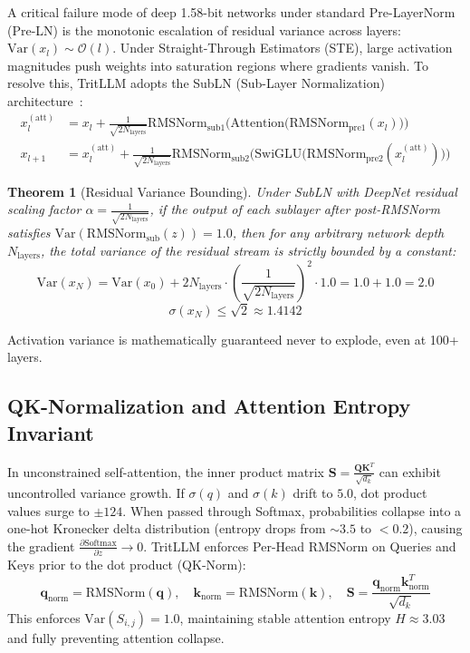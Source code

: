 \documentclass[11pt,a4paper]{article}
\newtheorem{theorem}{Theorem}
\begin{document}
A critical failure mode of deep 1.58-bit networks under standard Pre-LayerNorm (Pre-LN) is the monotonic escalation of residual variance across layers: $\text{Var}(x_l) \sim \mathcal{O}(l)$. Under Straight-Through Estimators (STE), large activation magnitudes push weights into saturation regions where gradients vanish. To resolve this, TritLLM adopts the SubLN (Sub-Layer Normalization) architecture~\cite{wang2022deepnet}:
\begin{align}
x_l^{(\text{att})} &= x_l + \frac{1}{\sqrt{2 N_{\text{layers}}}} \text{RMSNorm}_{\text{sub1}}\Big( \text{Attention}\big( \text{RMSNorm}_{\text{pre1}}(x_l) \big) \Big) \\
x_{l+1} &= x_l^{(\text{att})} + \frac{1}{\sqrt{2 N_{\text{layers}}}} \text{RMSNorm}_{\text{sub2}}\Big( \text{SwiGLU}\big( \text{RMSNorm}_{\text{pre2}}(x_l^{(\text{att})}) \big) \Big)
\end{align}

\begin{theorem}[Residual Variance Bounding]
Under SubLN with DeepNet residual scaling factor $\alpha = \frac{1}{\sqrt{2 N_{\text{layers}}}}$, if the output of each sublayer after post-RMSNorm satisfies $\text{Var}(\text{RMSNorm}_{\text{sub}}(z)) = 1.0$, then for any arbitrary network depth $N_{\text{layers}}$, the total variance of the residual stream is strictly bounded by a constant:
\begin{equation}
\text{Var}(x_N) = \text{Var}(x_0) + 2 N_{\text{layers}} \cdot \left(\frac{1}{\sqrt{2 N_{\text{layers}}}}\right)^2 \cdot 1.0 = 1.0 + 1.0 = \mathbf{2.0}
\end{equation}
\begin{equation}
\sigma(x_N) \le \sqrt{2} \approx \mathbf{1.4142}
\end{equation}
\end{theorem}
Activation variance is mathematically guaranteed never to explode, even at 100+ layers.

\subsection{QK-Normalization and Attention Entropy Invariant}

In unconstrained self-attention, the inner product matrix $\mathbf{S} = \frac{\mathbf{Q} \mathbf{K}^T}{\sqrt{d_k}}$ can exhibit uncontrolled variance growth. If $\sigma(q)$ and $\sigma(k)$ drift to $5.0$, dot product values surge to $\pm 124$. When passed through Softmax, probabilities collapse into a one-hot Kronecker delta distribution (entropy drops from $\sim 3.5$ to $< 0.2$), causing the gradient $\frac{\partial \text{Softmax}}{\partial z} \to 0$. TritLLM enforces Per-Head RMSNorm on Queries and Keys prior to the dot product (QK-Norm):
\begin{equation}
\mathbf{q}_{\text{norm}} = \text{RMSNorm}(\mathbf{q}), \quad \mathbf{k}_{\text{norm}} = \text{RMSNorm}(\mathbf{k}), \quad \mathbf{S} = \frac{\mathbf{q}_{\text{norm}} \mathbf{k}_{\text{norm}}^T}{\sqrt{d_k}}
\end{equation}
This enforces $\text{Var}(S_{i, j}) = 1.0$, maintaining stable attention entropy $H \approx 3.03$ and fully preventing attention collapse.
\end{document}
